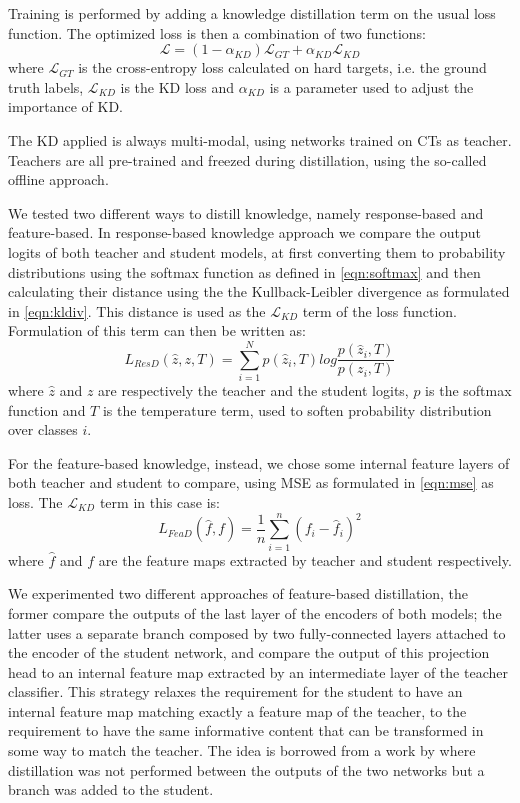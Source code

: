 Training is performed by adding a knowledge distillation term on the usual loss function.
The optimized loss is then a combination of two functions:
\begin{equation}
    \mathcal{L} = (1 - \alpha_{KD})\mathcal{L}_{GT} + \alpha_{KD}\mathcal{L}_{KD}
    \label{eqn:kd_loss}
\end{equation}
where $\mathcal{L}_{GT}$ is the cross-entropy loss calculated on hard targets, i.e. the ground truth labels, $\mathcal{L}_{KD}$ is the KD loss and $\alpha_{KD}$ is a parameter used to adjust the importance of KD.

The KD applied is always multi-modal, using networks trained on CTs as teacher.
Teachers are all pre-trained and freezed during distillation, using the so-called offline approach.

We tested two different ways to distill knowledge, namely response-based and feature-based.
In response-based knowledge approach we compare the output logits of both teacher and student models, at first converting them to probability distributions using the softmax function as defined in \ref{eqn:softmax} and then calculating their distance using the the Kullback-Leibler divergence as formulated in \ref{eqn:kldiv}.
This distance is used as the $\mathcal{L}_{KD}$ term of the loss function.
Formulation of this term can then be written as:
\begin{equation}
    L_{ResD}(\hat{z}, z, T) = \sum_{i=1}^{N} p(\hat{z}_i, T) log\frac{p(\hat{z}_i, T)}{p(z_i, T)}
    \label{eqn:resp_kd_loss}
\end{equation}
where $\hat{z}$ and $z$ are respectively the teacher and the student logits, $p$ is the softmax function and $T$ is the temperature term, used to soften probability distribution over classes $i$.

For the feature-based knowledge, instead, we chose some internal feature layers of both teacher and student to compare, using MSE as formulated in \ref{eqn:mse} as loss.
The $\mathcal{L}_{KD}$ term in this case is:
\begin{equation}
    L_{FeaD}(\hat{f}, f) = \frac{1}{n} \sum\limits_{i=1}^n (f_i - \hat{f}_i)^2
    \label{eqn:feat_kd_loss}
\end{equation}
where $\hat{f}$ and $f$ are the feature maps extracted by teacher and student respectively.

We experimented two different approaches of feature-based distillation, the former compare the outputs of the last layer of the encoders of both models; the latter uses a separate branch composed by two fully-connected layers attached to the encoder of the student network, and compare the output of this projection head to an internal feature map extracted by an intermediate layer of the teacher classifier.
This strategy relaxes the requirement for the student to have an internal feature map matching exactly a feature map of the teacher, to the requirement to have the same informative content that can be transformed in some way to match the teacher.
The idea is borrowed from a work by \citeauthor{fini2022self} \cite{fini2022self} where distillation was not performed between the outputs of the two networks but a branch was added to the student.

